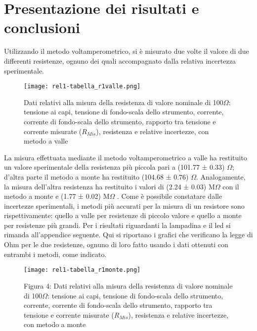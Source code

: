 \documentclass{article}
\begin{document}
\section{Presentazione dei risultati e conclusioni}
Utilizzando il metodo voltamperometrico, si è misurato due volte il valore di due differenti resistenze, ognuno dei quali accompagnato dalla relativa incertezza sperimentale.
\begin{figure}
    \centering
    \texttt{[image: rel1-tabella\_r1valle.png]}
    \caption{Dati relativi alla misura della resistenza di valore nominale di 100$\Omega$:
tensione ai capi, tensione di fondo-scala dello strumento, corrente, corrente di
fondo-scala dello strumento, rapporto tra tensione e corrente misurate ($R_{Mis}$),
resistenza e relative incertezze, con metodo a valle}
    \label{figura3}
\end{figure}
La misura effettuata mediante il metodo voltamperometrico a
valle ha restituito un valore sperimentale della resistenza più piccola pari a
(101.77 ± 0.33) $\Omega$; d’altra parte il metodo a monte ha restituito (104.68 ± 0.76)
$\Omega$. Analogamente, la misura dell’altra resistenza ha restituito i valori di (2.24
± 0.03) M$\Omega$ con il metodo a monte e (1.77 ± 0.02) M$\Omega$ . Come è possibile constatare dalle incertezze sperimentali, i metodi più accurati per la misura di un resistore sono rispettivamente: quello a valle per resistenze di piccolo valore e quello a monte per resistenze più grandi. Per i risultati riguardanti la lampadina e il led si rimanda all’appendice seguente.
Qui si riportano i grafici che verificano la legge di Ohm per le due resistenze,
ognuno di loro fatto usando i dati ottenuti con entrambi i metodi, come indicato.
\begin{figure}
    \centering
    \texttt{[image: rel1-tabella\_r1monte.png]}
    \caption{Figura 4: Dati relativi alla misura della resistenza di valore nominale di 100$\Omega$:
tensione ai capi, tensione di fondo-scala dello strumento, corrente, corrente di
fondo-scala dello strumento, rapporto tra tensione e corrente misurate ($R_{Mis}$),
resistenza e relative incertezze, con metodo a monte}
    \label{figura4}
\end{figure}
\end{document}
